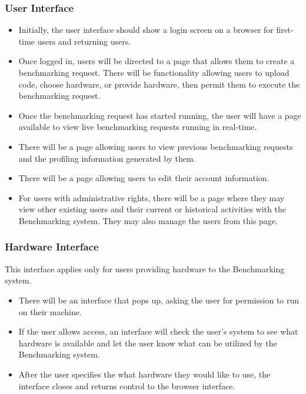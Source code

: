 \documentclass{article}
\begin{document}
    	\subsubsection{User Interface}
        	\begin{itemize}
            	\item Initially, the user interface should show a login screen on a browser for first-time users and returning users.
                \item Once logged in, users will be directed to a page that allows them to create a benchmarking request. There will be functionality allowing users to upload code, choose hardware, or provide hardware, then permit them to execute the benchmarking request. 
                \item Once the benchmarking request has started running, the user will have a page available to view live benchmarking requests running in real-time. 
                \item There will be a page allowing users to view previous benchmarking requests and the profiling information generated by them. 
                \item There will be a page allowing users to edit their account information. 
                \item For users with administrative rights, there will be a page where they may view other existing users and their current or historical activities with the Benchmarking system. They may also manage the users from this page. 
    		\end{itemize}
       \subsubsection{Hardware Interface}
       		This interface applies only for users providing hardware to the Benchmarking system. 
       		\begin{itemize}
            	\item There will be an interface that pops up, asking the user for permission to run on their machine. 
                \item If the user allows access, an interface will check the user's system to see what hardware is available and let the user know what can be utilized by the Benchmarking system. 
                \item After the user specifies the what hardware they would like to use, the interface closes and returns control to the browser interface.  
            \end{itemize}
\end{document}
